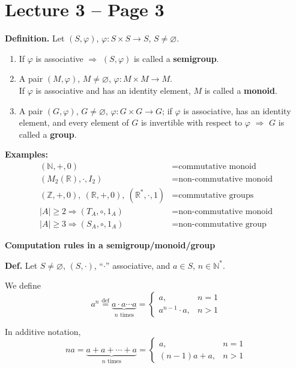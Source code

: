 \documentclass[12pt]{article}
\begin{document}
\section*{Lecture 3 -- Page 3}

\noindent\textbf{Definition.} Let $(S,\varphi)$, $\varphi : S \times S \to S$, $S \neq \varnothing$.

\begin{enumerate}
\item[(1)] If $\varphi$ is associative $\Rightarrow$ $(S,\varphi)$ is called a \textbf{semigroup}.

\item[(2)] A pair $(M,\varphi)$, $M \neq \varnothing$, $\varphi : M \times M \to M$.\\
If $\varphi$ is associative and has an identity element, $M$ is called a \textbf{monoid}.

\item[(3)] A pair $(G,\varphi)$, $G \neq \varnothing$, $\varphi : G \times G \to G$; if $\varphi$ is associative, has an identity element, and every element of $G$ is invertible with respect to $\varphi$ $\Rightarrow$ $G$ is called a \textbf{group}.
\end{enumerate}

\noindent\textbf{Examples:}
\begin{align*}
(\mathbb{N},+,0) &= \text{commutative monoid} \\
(M_2(\mathbb{R}), \cdot, I_2) &= \text{non-commutative monoid} \\
(\mathbb{Z},+,0),\ (\mathbb{R},+,0),\ (\mathbb{R}^*,\cdot,1) &= \text{commutative groups} \\
|A| \geq 2 \Rightarrow (T_A,\circ,1_A) &= \text{non-commutative monoid} \\
|A| \geq 3 \Rightarrow (S_A,\circ,1_A) &= \text{non-commutative group}
\end{align*}

\noindent\textbf{Computation rules in a semigroup/monoid/group}

\noindent\textbf{Def.} Let $S \neq \varnothing$, $(S,\cdot)$, ``$\cdot$'' associative, and $a \in S$, $n \in \mathbb{N}^*$.

\noindent We define
\[
a^n \overset{\text{def}}{=} \underbrace{a \cdot a \cdots a}_{n \text{ times}} =
\begin{cases}
a, & n=1 \\
a^{n-1}\cdot a, & n>1
\end{cases}
\]

\noindent In additive notation,
\[
na = \underbrace{a+a+\cdots+a}_{n \text{ times}} =
\begin{cases}
a, & n=1 \\
(n-1)a+a, & n>1
\end{cases}
\]
\end{document}
